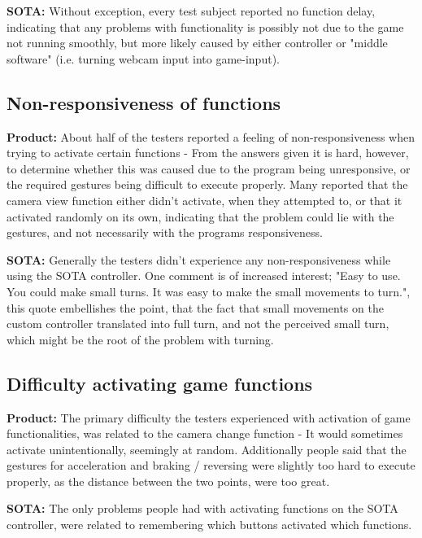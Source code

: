\noindent\textbf{SOTA:}\newline
Without exception, every test subject reported no function delay, indicating that any problems with functionality is possibly not due to the game not running smoothly, but more likely caused by either controller or "middle software" (i.e. turning webcam input into game-input).


\subsection*{Non-responsiveness of functions}
\noindent\textbf{Product: }\newline
About half of the testers reported a feeling of non-responsiveness when trying to activate certain functions - From the answers given it is hard, however, to determine whether this was caused due to the program being unresponsive, or the required gestures being difficult to execute properly. Many reported that the camera view function either didn't activate, when they attempted to, or that it activated randomly on its own, indicating that the problem could lie with the gestures, and not necessarily with the programs responsiveness.
\bigskip

\noindent\textbf{SOTA:}\newline
Generally the testers didn't experience any non-responsiveness while using the SOTA controller. One comment is of increased interest; "Easy to use. You could make small turns. It was easy to make the small movements to turn.", this quote embellishes the point, that the fact that small movements on the custom controller translated into full turn, and not the perceived small turn, which might be the root of the problem with turning.


\subsection*{Difficulty activating game functions}
\noindent\textbf{Product: }\newline
The primary difficulty the testers experienced with activation of game functionalities, was related to the camera change function - It would sometimes activate unintentionally, seemingly at random. Additionally people said that the gestures for acceleration and braking / reversing were slightly too hard to execute properly, as the distance between the two points, were too great.
\bigskip

\noindent\textbf{SOTA:}\newline
The only problems people had with activating functions on the SOTA controller, were related to remembering which buttons activated which functions.


